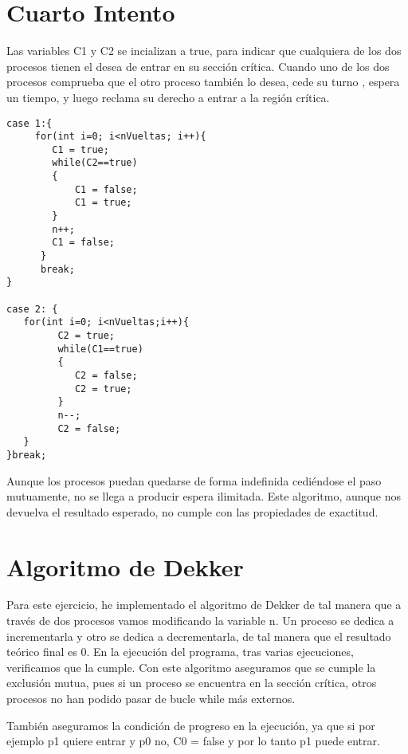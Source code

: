 \documentclass{article}
\begin{document}
\section{Cuarto Intento}
Las variables C1 y C2 se incializan a true, para indicar que cualquiera de los dos procesos tienen el desea de entrar en su sección crítica. Cuando uno de los dos procesos comprueba que el otro proceso también lo desea, cede su turno , espera un tiempo, y luego reclama su derecho a entrar a la región crítica. 
\hfill \break
\begin{verbatim}
case 1:{
     for(int i=0; i<nVueltas; i++){
        C1 = true;
        while(C2==true)
        {
        	C1 = false;
        	C1 = true;        				
        }        			
        n++;
        C1 = false;        	      
      }
      break;
}

case 2: {
   for(int i=0; i<nVueltas;i++){
         C2 = true;
         while(C1==true)
         {
            C2 = false;
            C2 = true;
         }        	      
         n--;
         C2 = false;
   }
}break;

\end{verbatim}
\hfill \break
\hfill \break
Aunque los procesos puedan quedarse de forma indefinida cediéndose el paso mutuamente, no se llega a producir espera ilimitada.
Este algoritmo, aunque nos devuelva el resultado esperado, no cumple con las propiedades de exactitud.


\section{Algoritmo de Dekker}
Para este ejercicio, he implementado el algoritmo de Dekker de tal manera que a través de dos procesos vamos modificando la variable n.
Un proceso se dedica a incrementarla y otro se dedica a decrementarla, de tal manera que el resultado teórico final es 0.
En la ejecución del programa, tras varias ejecuciones, verificamos que la cumple.
Con este algoritmo aseguramos que se cumple la exclusión mutua, pues si un proceso se encuentra en la sección crítica, otros procesos no han podido pasar de bucle while más externos.

También aseguramos la condición de progreso en la ejecución, ya que si por ejemplo p1 quiere entrar y p0 no, C0 = false y por lo tanto p1 puede entrar.
\end{document}
